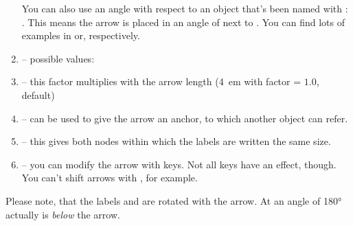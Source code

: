 \documentclass[toc=index,DIV10]{cnpkgdoc}
\begin{document}
\begin{enumerate}
 You can also use an angle with respect to an object that's been named with
 : . This means the arrow is placed in an
 angle of  next to . You can find lots of examples in
  or, respectively.
\item{} -- possible values:
 \begin{rxn}
  \dummy[a]
  \branch[below=of a,b,yshift=.5em]{\arrow{}{}\reactant{\ttfamily -\textgreater}}
  \branch[below=of b,c,yshift=.5em]{\arrow[,<-]{}{}\reactant{\ttfamily \textless-}}
  \branch[below=of c,d,xshift=.25em,yshift=.5em]{\arrow[,<->]{}{}\reactant{\ttfamily \textless-\textgreater}}
  \branch[below=of d,e,yshift=.5em]{\arrow[,<=>]{}{}\reactant{\ttfamily \textless=\textgreater}}
  \branch[below=of e,f,xshift=.25em,yshift=.5em]{\arrow[,<=>>]{}{}\reactant{\ttfamily \textless=\textgreater{}\textgreater}}
  \branch[below=of f,g,yshift=.5em]{\arrow[,<<=>]{}{}\reactant{\ttfamily \textless{}\textless=\textgreater}}
  \branch[below=of g,h,xshift=-.25em,yshift=.5em]{\arrow[,-|>]{}{}\reactant{\ttfamily -\textbar\textgreater}}
  \branch[below=of h,,yshift=.5em]{\arrow[,-+>]{ }{ }\reactant{\ttfamily -+\textgreater}}
 \end{rxn}
\item{} -- this factor multiplies with the arrow length
  (\SI{4}{em} with factor = $1.0$, default)
\item{} -- can be used to give the arrow an anchor, to which another
  object can refer.
\item{}-- this gives both nodes within which the labels are written the
  same size.
\item{} -- you can modify the arrow with \TikZ keys. Not all \TikZ
  keys have an effect, though. You can't shift arrows with ,
  for example.
\end{enumerate}
\begin{beispiel}
  \begin{rxn}
 \end{rxn}
\end{beispiel}
Please note, that the labels  and  are rotated with
the arrow. At an angle of \ang{180}  actually is \emph{below} the arrow.
\begin{beispiel}
 \begin{rxn}
  \setarrowlength{2.5em}
  \dummy[a]
 \end{rxn}
\end{beispiel}
\end{document}
